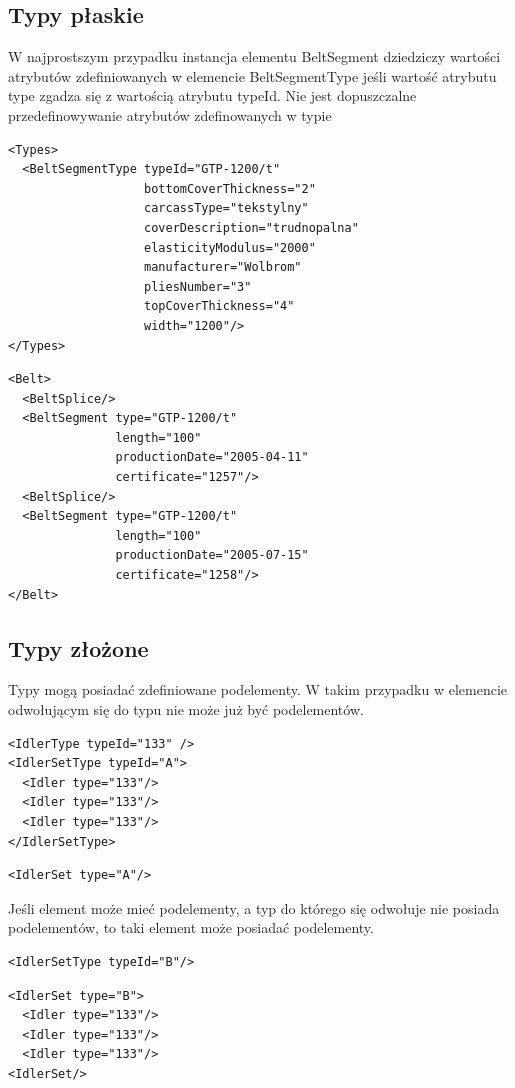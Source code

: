 \documentclass[12pt,a4paper]{article}
\begin{document}
\subsection{Typy płaskie}
W najprostszym przypadku instancja elementu BeltSegment dziedziczy wartości
atrybutów zdefiniowanych w
elemencie BeltSegmentType jeśli wartość atrybutu type zgadza się z wartością
atrybutu typeId.  Nie jest dopuszczalne przedefinowywanie atrybutów zdefinowanych
w typie

\begin{verbatim}
<Types>
  <BeltSegmentType typeId="GTP-1200/t"
                   bottomCoverThickness="2"
                   carcassType="tekstylny"
                   coverDescription="trudnopalna"
                   elasticityModulus="2000"
                   manufacturer="Wolbrom"
                   pliesNumber="3"
                   topCoverThickness="4"
                   width="1200"/>
</Types>
\end{verbatim}

\begin{verbatim}
<Belt>
  <BeltSplice/>
  <BeltSegment type="GTP-1200/t"
               length="100"
               productionDate="2005-04-11"
               certificate="1257"/>
  <BeltSplice/>
  <BeltSegment type="GTP-1200/t"
               length="100"
               productionDate="2005-07-15"
               certificate="1258"/>
</Belt>
\end{verbatim}


\subsection{Typy złożone}
Typy mogą posiadać zdefiniowane podelementy.  W takim przypadku w elemencie
odwołującym się do typu nie może już być podelementów. 

\begin{verbatim}
<IdlerType typeId="133" />
<IdlerSetType typeId="A">
  <Idler type="133"/>
  <Idler type="133"/>
  <Idler type="133"/>
</IdlerSetType>
\end{verbatim}

\begin{verbatim}
<IdlerSet type="A"/>
\end{verbatim}

Jeśli element może mieć podelementy, a typ do którego się odwołuje nie posiada
podelementów, to taki element może posiadać podelementy.

\begin{verbatim}
<IdlerSetType typeId="B"/>
\end{verbatim}

\begin{verbatim}
<IdlerSet type="B">
  <Idler type="133"/>
  <Idler type="133"/>
  <Idler type="133"/>
<IdlerSet/>
\end{verbatim}
\end{document}
